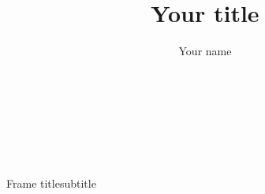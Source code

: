 \documentclass[10pt,aspectratio=169]{beamer}
\title{Your title}
\author{Your name}
\institute{Your Institute}
\date{\nztoday}
\begin{document}
\masseyBrand{}{}{}{}



\begin{frame}[t]  %
\masseyTitlepage %

\raggedleft
\begin{mblock}[180pt]{0.7}{}
\raggedleft
\textbf{\insertauthor}\\
\insertdepartment\\
\insertinstitute\\
\insertcontact\\
\insertdate
\end{mblock}
\vfill
\end{frame}


\masseyBrand{}{}{}{}

\begin{frame}{Frame title}{subtitle}
\end{frame}


\begin{frame}[plain]
\end{frame}
\end{document}
